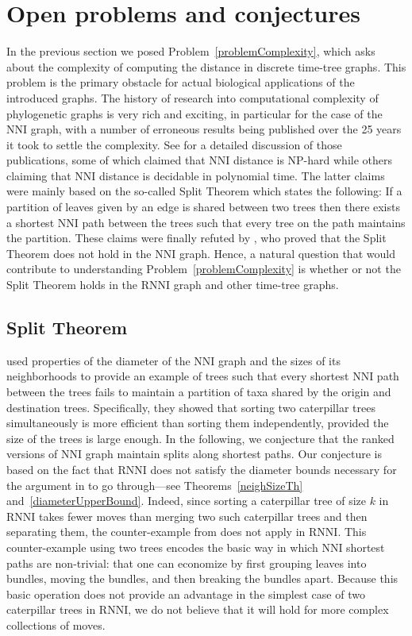 \documentclass[11pt]{amsart}
\theoremstyle{definition}
\newcommand{\nni}{\mathrm{NNI}}
\newcommand{\rnni}{\mathrm{RNNI}}
\begin{document}
\section{Open problems and conjectures}

In the previous section we posed Problem~\ref{problemComplexity}, which asks about the complexity of computing the distance in discrete time-tree graphs.
This problem is the primary obstacle for actual biological applications of the introduced graphs.
The history of research into computational complexity of phylogenetic graphs is very rich and exciting, in particular for the case of the $\nni$ graph, with a number of erroneous results being published over the 25 years it took to settle the complexity.
See \autocite{Dasgupta2000-xa} for a detailed discussion of those publications, some of which claimed that $\nni$ distance is NP-hard while others claiming that $\nni$ distance is decidable in polynomial time.
The latter claims were mainly based on the so-called Split Theorem which states the following:
If a partition of leaves given by an edge is shared between two trees then there exists a shortest $\nni$ path between the trees such that every tree on the path maintains the partition.
These claims were finally refuted by \textcite{li1996some}, who proved that the Split Theorem does not hold in the $\nni$ graph.
Hence, a natural question that would contribute to understanding Problem~\ref{problemComplexity} is whether or not the Split Theorem holds in the $\rnni$ graph and other time-tree graphs.


\subsection{Split Theorem}

\textcite{li1996some} used properties of the diameter of the $\nni$ graph and the sizes of its neighborhoods to provide an example of trees such that every shortest $\nni$ path between the trees fails to maintain a partition of taxa shared by the origin and destination trees.
Specifically, they showed that sorting two caterpillar trees simultaneously is more efficient than sorting them independently, provided the size of the trees is large enough.
In the following, we conjecture that the ranked versions of $\nni$ graph maintain splits along shortest paths.
Our conjecture is based on the fact that $\rnni$ does not satisfy the diameter bounds necessary for the argument in \autocite{li1996some} to go through---see Theorems~\ref{neighSizeTh} and~\ref{diameterUpperBound}.
Indeed, since sorting a caterpillar tree of size $k$ in $\rnni$ takes fewer moves than merging two such caterpillar trees and then separating them, the counter-example from \autocite{li1996some} does not apply in $\rnni$.
This counter-example using two trees encodes the basic way in which $\nni$ shortest paths are non-trivial: that one can economize by first grouping leaves into bundles, moving the bundles, and then breaking the bundles apart.
Because this basic operation does not provide an advantage in the simplest case of two caterpillar trees in $\rnni$, we do not believe that it will hold for more complex collections of moves.
\end{document}

